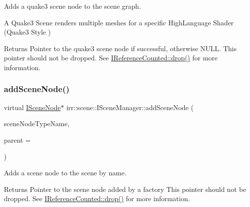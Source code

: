 Adds a quake3 scene node to the scene graph. 

A Quake3 Scene renders multiple meshes for a specific High\+Language Shader (Quake3 Style ) \begin{DoxyReturn}{Returns}
Pointer to the quake3 scene node if successful, otherwise N\+U\+LL. This pointer should not be dropped. See \hyperlink{classirr_1_1IReferenceCounted_a03856a09355b89d178090c4a5f738543}{I\+Reference\+Counted\+::drop()} for more information. 
\end{DoxyReturn}
\mbox{\label{classirr_1_1scene_1_1ISceneManager_a22ea17e8c06a773af9828f7bb70cdc40}} 
\subsubsection{\texorpdfstring{add\+Scene\+Node()}{addSceneNode()}}
{\footnotesize\ttfamily virtual \hyperlink{classirr_1_1scene_1_1ISceneNode}{I\+Scene\+Node}$\ast$ irr\+::scene\+::\+I\+Scene\+Manager\+::add\+Scene\+Node (\begin{DoxyParamCaption}\item[{const char $\ast$}]{scene\+Node\+Type\+Name,  }\item[{\hyperlink{classirr_1_1scene_1_1ISceneNode}{I\+Scene\+Node} $\ast$}]{parent = {} }\end{DoxyParamCaption})\hspace{0.3cm}{\ttfamily [pure virtual]}}



Adds a scene node to the scene by name. 

\begin{DoxyReturn}{Returns}
Pointer to the scene node added by a factory This pointer should not be dropped. See \hyperlink{classirr_1_1IReferenceCounted_a03856a09355b89d178090c4a5f738543}{I\+Reference\+Counted\+::drop()} for more information. 
\end{DoxyReturn}
\mbox{\label{classirr_1_1scene_1_1ISceneManager_a2b08b9f20ec62faeffc02b9fed9fd683}} 

